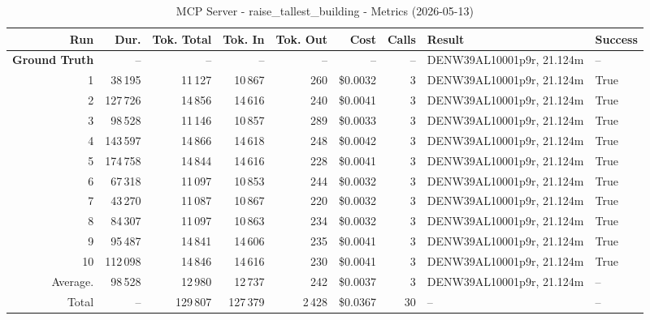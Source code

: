 \documentclass[a4paper,11pt]{article}
\begin{document}
\begin{table}[ht]
\centering
\scriptsize
\caption{MCP Server - raise\_tallest\_building - Metrics (2026-05-13)}
\label{tab:mcp\_raise\_tallest\_building\_metrics\_2026-05-13}
\begin{tabular}{r r r r r r r p{3cm} l}
\hline
Run & Dur. & Tok. Total & Tok. In & Tok. Out & Cost & Calls & Result & Success \\
\hline
\textbf{Ground Truth} & -- & -- & -- & -- & -- & -- & DENW39AL10001p9r, 21.124m & -- \\
\hline
1 & 38\,195 & 11\,127 & 10\,867 & 260 & \$0.0032 & 3 & DENW39AL10001p9r, 21.124m & True \\
2 & 127\,726 & 14\,856 & 14\,616 & 240 & \$0.0041 & 3 & DENW39AL10001p9r, 21.124m & True \\
3 & 98\,528 & 11\,146 & 10\,857 & 289 & \$0.0033 & 3 & DENW39AL10001p9r, 21.124m & True \\
4 & 143\,597 & 14\,866 & 14\,618 & 248 & \$0.0042 & 3 & DENW39AL10001p9r, 21.124m & True \\
5 & 174\,758 & 14\,844 & 14\,616 & 228 & \$0.0041 & 3 & DENW39AL10001p9r, 21.124m & True \\
6 & 67\,318 & 11\,097 & 10\,853 & 244 & \$0.0032 & 3 & DENW39AL10001p9r, 21.124m & True \\
7 & 43\,270 & 11\,087 & 10\,867 & 220 & \$0.0032 & 3 & DENW39AL10001p9r, 21.124m & True \\
8 & 84\,307 & 11\,097 & 10\,863 & 234 & \$0.0032 & 3 & DENW39AL10001p9r, 21.124m & True \\
9 & 95\,487 & 14\,841 & 14\,606 & 235 & \$0.0041 & 3 & DENW39AL10001p9r, 21.124m & True \\
10 & 112\,098 & 14\,846 & 14\,616 & 230 & \$0.0041 & 3 & DENW39AL10001p9r, 21.124m & True \\
\hline
Average. & 98\,528 & 12\,980 & 12\,737 & 242 & \$0.0037 & 3 & DENW39AL10001p9r, 21.124m & -- \\
Total & -- & 129\,807 & 127\,379 & 2\,428 & \$0.0367 & 30 & -- & -- \\
\hline
\end{tabular}
\end{table}

\clearpage
\end{document}
